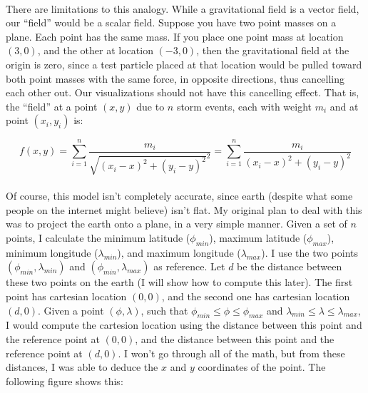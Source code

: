 \documentclass[a4paper]{article}
\begin{document}
\paragraph{}There are limitations to this analogy. While a gravitational field is a vector field, our ``field'' would be a scalar field. Suppose you have two point masses on a plane. Each point has the same mass. If you place one point mass at location $(3, 0)$, and the other at location $(-3, 0)$, then the gravitational field at the origin is zero, since a test particle placed at that location would be pulled toward both point masses with the same force, in opposite directions, thus cancelling each other out. Our visualizations should not have this cancelling effect. That is, the ``field'' at a point $(x, y)$ due to $n$ storm events, each with weight $m_{i}$ and at point $(x_{i}, y_{i})$ is:

\begin{equation}
  f(x, y) = \sum_{i = 1}^{n} \dfrac{m_{i}}{\sqrt{(x_{i} - x)^{2} + (y_{i} - y)^{2}}^{2}} = \sum_{i = 1}^{n} \dfrac{m_{i}}{(x_{i} - x)^{2} + (y_{i} - y)^{2}}
\end{equation}

\paragraph{} Of course, this model isn't completely accurate, since earth (despite what some people on the internet might believe) isn't flat. My original plan to deal with this was to project the earth onto a plane, in a very simple manner. Given a set of $n$ points, I calculate the minimum latitude ($\phi_{min}$), maximum latitude ($\phi_{max}$), minimum longitude ($\lambda_{min}$), and maximum longitude ($\lambda_{max}$). I use the two points $(\phi_{min}, \lambda_{min})$ and $(\phi_{min}, \lambda_{max})$ as reference. Let $d$ be the distance between these two points on the earth (I will show how to compute this later). The first point has cartesian location $(0, 0)$, and the second one has cartesian location $(d, 0)$. Given a point $(\phi, \lambda)$, such that $\phi_{min} \leq \phi \leq \phi_{max}$ and $\lambda_{min} \leq \lambda \leq \lambda_{max}$, I would compute the cartesion location using the distance between this point and the reference point at $(0, 0)$, and the distance between this point and the reference point at $(d, 0)$. I won't go through all of the math, but from these distances, I was able to deduce the $x$ and $y$ coordinates of the point. The following figure shows this:
\end{document}
